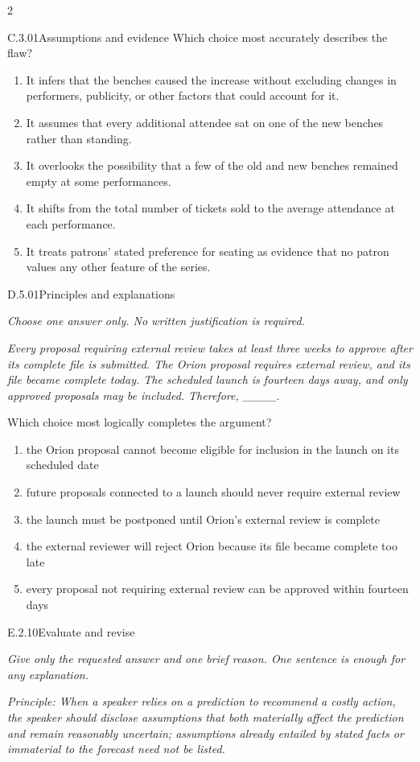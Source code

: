 \documentclass[9pt]{extarticle}
\newcommand{\choice}[1]{\item #1}
\begin{document}
\begin{multicols}{2}
\begin{DenseCoreProblem}{C.3.01}{Assumptions and evidence}
Which choice most accurately describes the flaw?
\begin{enumerate}[label=(\alph*)]
  \choice{It infers that the benches caused the increase without excluding changes in performers, publicity, or other factors that could account for it.}
  \choice{It assumes that every additional attendee sat on one of the new benches rather than standing.}
  \choice{It overlooks the possibility that a few of the old and new benches remained empty at some performances.}
  \choice{It shifts from the total number of tickets sold to the average attendance at each performance.}
  \choice{It treats patrons' stated preference for seating as evidence that no patron values any other feature of the series.}
\end{enumerate}
\end{DenseCoreProblem}
\begin{DenseCoreProblem}{D.5.01}{Principles and explanations}
{\scriptsize\textit{Choose one answer only. No written justification is required.}\par}
\emph{Every proposal requiring external review takes at least three weeks to approve after its complete file is submitted. The Orion proposal requires external review, and its file became complete today. The scheduled launch is fourteen days away, and only approved proposals may be included. Therefore, \_\_\_\_.}

Which choice most logically completes the argument?
\begin{enumerate}[label=(\alph*)]
  \choice{the Orion proposal cannot become eligible for inclusion in the launch on its scheduled date}
  \choice{future proposals connected to a launch should never require external review}
  \choice{the launch must be postponed until Orion's external review is complete}
  \choice{the external reviewer will reject Orion because its file became complete too late}
  \choice{every proposal not requiring external review can be approved within fourteen days}
\end{enumerate}
\end{DenseCoreProblem}
\begin{DenseCoreProblem}{E.2.10}{Evaluate and revise}
{\scriptsize\textit{Give only the requested answer and one brief reason. One sentence is enough for any explanation.}\par}
\emph{Principle: When a speaker relies on a prediction to recommend a costly action, the speaker should disclose assumptions that both materially affect the prediction and remain reasonably uncertain; assumptions already entailed by stated facts or immaterial to the forecast need not be listed.}


\end{DenseCoreProblem}
\end{multicols}
\end{document}
